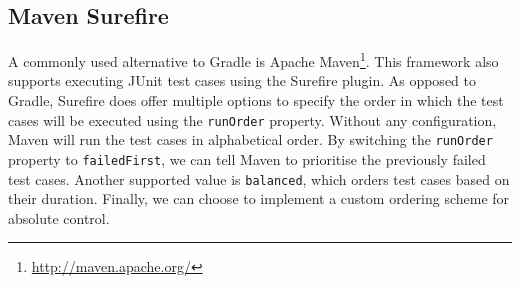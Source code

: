 
\subsection{Maven Surefire}
A commonly used alternative to Gradle is Apache Maven\footnote{\url{http://maven.apache.org/}}. This framework also supports executing JUnit test cases using the Surefire plugin. As opposed to Gradle, Surefire does offer multiple options to specify the order in which the test cases will be executed using the \texttt{runOrder} property. Without any configuration, Maven will run the test cases in alphabetical order. By switching the \texttt{runOrder} property to \texttt{failedFirst}, we can tell Maven to prioritise the previously failed test cases. Another supported value is \texttt{balanced}, which orders test cases based on their duration. Finally, we can choose to implement a custom ordering scheme for absolute control.